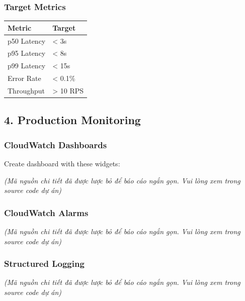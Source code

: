 \hypertarget{target-metrics}{%
\subsubsection{Target Metrics}}

\begingroup
\small
\setlength{\tabcolsep}{3pt}
\renewcommand{\arraystretch}{1.15}
\begin{longtable}[]{@{}ll@{}}
\toprule\noalign{}
Metric & Target \\
\midrule\noalign{}
\endhead
\bottomrule\noalign{}
\endlastfoot
p50 Latency & \textless{} 3s \\
p95 Latency & \textless{} 8s \\
p99 Latency & \textless{} 15s \\
Error Rate & \textless{} 0.1\% \\
Throughput & \textgreater{} 10 RPS \\
\end{longtable}
\endgroup

\hypertarget{production-monitoring}{%
\subsection{4. Production Monitoring}}

\hypertarget{cloudwatch-dashboards}{%
\subsubsection{CloudWatch Dashboards}}

Create dashboard with these widgets:

\emph{(Mã nguồn chi tiết đã được lược bỏ để báo cáo ngắn gọn. Vui lòng
xem trong source code dự án)}

\hypertarget{cloudwatch-alarms}{%
\subsubsection{CloudWatch Alarms}}

\emph{(Mã nguồn chi tiết đã được lược bỏ để báo cáo ngắn gọn. Vui lòng
xem trong source code dự án)}

\hypertarget{structured-logging}{%
\subsubsection{Structured Logging}}

\emph{(Mã nguồn chi tiết đã được lược bỏ để báo cáo ngắn gọn. Vui lòng
xem trong source code dự án)}

